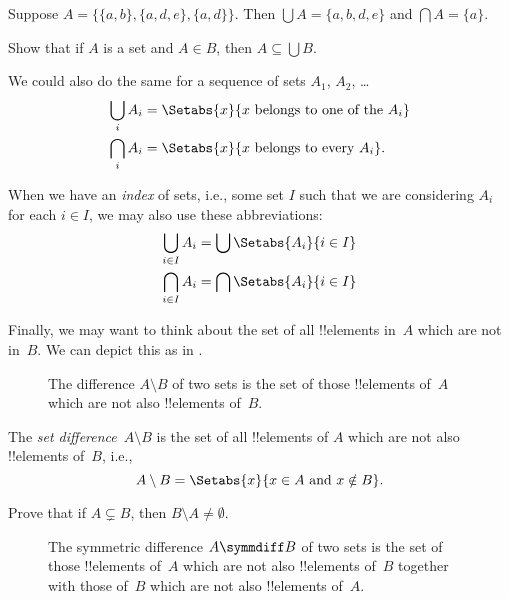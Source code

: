 \documentclass[../../../include/open-logic-section]{subfiles}
\begin{document}
\begin{ex}
Suppose $A = \{ \{ a, b \}, \{ a, d, e \}, \{ a, d \} \}$.
Then $\bigcup A = \{ a, b, d, e \}$ and $\bigcap A = \{ a \}$.
\end{ex}
\begin{prob}
	Show that if $A$ is a set and $A \in B$, then $A \subseteq \bigcup B$.
\end{prob}

We could also do the same for a sequence of sets $A_1$, $A_2$, \dots
\begin{align*}
\bigcup_i A_i & = \Setabs{x}{x \text{ belongs to one of the } A_i}\\
\bigcap_i A_i & = \Setabs{x}{x \text{ belongs to every } A_i}.
\end{align*}

When we have an \emph{index} of sets, i.e., some set $I$ such that we
are considering $A_i$ for each $i \in I$, we may also use these
abbreviations:
\begin{align*}
	\bigcup_{i \in I} A_i & = \bigcup \Setabs{A_i }{i \in I}\\
	\bigcap_{i \in I} A_i & = \bigcap\Setabs{A_i}{i \in I}
\end{align*}

Finally, we may want to think about the set of all !!{element}s in~$A$
which are not in~$B$. We can depict this as in .

\begin{figure}
  \centering
  \caption{The difference $A \setminus B$ of two sets is the set of
    those !!{element}s of~$A$ which are not also !!{element}s of~$B$.}
\end{figure}

\begin{defn}[Difference]
The \emph{set difference}~$A \setminus B$ is the set of all !!{element}s of
$A$ which are not also !!{element}s of~$B$, i.e.,
\[
A\setminus B = \Setabs{x}{x\in A \text{ and } x \notin B}.
\]
\end{defn}

\begin{prob}
	Prove that if $A \subsetneq B$, then $B \setminus A \neq \emptyset$.
\end{prob}


\begin{figure}
	\centering
	\caption{The symmetric difference $A \symmdiff B$ of two sets is the set of
		those !!{element}s of~$A$ which are not also !!{element}s of~$B$ together with those of~$B$ which are not also !!{element}s of~$A$.}
\end{figure}
\end{document}
